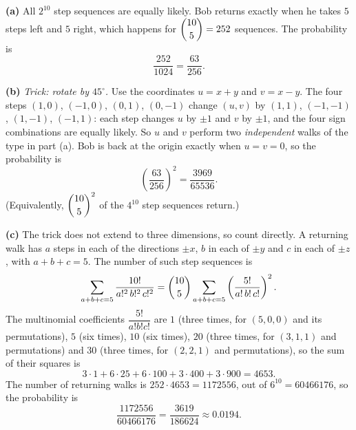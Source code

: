 \textbf{(a)} All $2^{10}$ step sequences are equally likely. Bob returns exactly when he takes $5$ steps left and $5$ right, which happens for $\dbinom{10}{5}=252$ sequences. The probability is
\[
\dfrac{252}{1024}=\boxed{\dfrac{63}{256}}.
\]

\textbf{(b)} \emph{Trick: rotate by $45^\circ$.} Use the coordinates $u=x+y$ and $v=x-y$. The four steps $(1,0)$, $(-1,0)$, $(0,1)$, $(0,-1)$ change $(u,v)$ by $(1,1)$, $(-1,-1)$, $(1,-1)$, $(-1,1)$: each step changes $u$ by $\pm1$ and $v$ by $\pm1$, and the four sign combinations are equally likely. So $u$ and $v$ perform two \emph{independent} walks of the type in part (a). Bob is back at the origin exactly when $u=v=0$, so the probability is
\[
\left(\dfrac{63}{256}\right)^2=\boxed{\dfrac{3969}{65536}}.
\]
(Equivalently, $\dbinom{10}{5}^2$ of the $4^{10}$ step sequences return.)

\textbf{(c)} The trick does not extend to three dimensions, so count directly. A returning walk has $a$ steps in each of the directions $\pm x$, $b$ in each of $\pm y$ and $c$ in each of $\pm z$, with $a+b+c=5$. The number of such step sequences is
\[
\sum_{a+b+c=5}\dfrac{10!}{a!^2\,b!^2\,c!^2}=\dbinom{10}{5}\sum_{a+b+c=5}\left(\dfrac{5!}{a!\,b!\,c!}\right)^2 .
\]
The multinomial coefficients $\dfrac{5!}{a!b!c!}$ are $1$ (three times, for $(5,0,0)$ and its permutations), $5$ (six times), $10$ (six times), $20$ (three times, for $(3,1,1)$ and permutations) and $30$ (three times, for $(2,2,1)$ and permutations), so the sum of their squares is
\[
3\cdot1+6\cdot25+6\cdot100+3\cdot400+3\cdot900=4653 .
\]
The number of returning walks is $252\cdot4653=1172556$, out of $6^{10}=60466176$, so the probability is
\[
\dfrac{1172556}{60466176}=\boxed{\dfrac{3619}{186624}}\approx0.0194 .
\]
